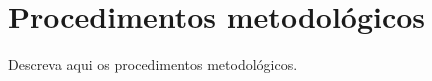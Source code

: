 \section{Procedimentos metodológicos}
\label{sec:procedimentos-metodologicos}


Descreva aqui os procedimentos metodológicos.
